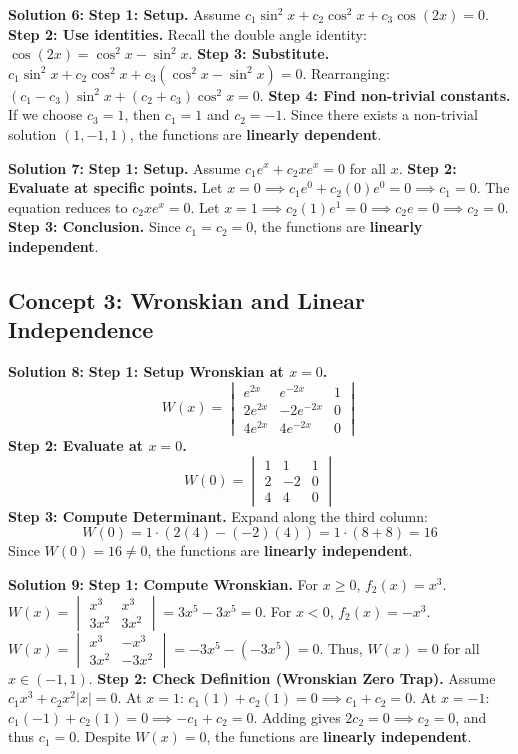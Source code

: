 \documentclass[12pt]{article}
\begin{document}
\textbf{Solution 6:}
\textbf{Step 1: Setup.} Assume $c_1\sin^2 x + c_2\cos^2 x + c_3\cos(2x) = 0$.
\textbf{Step 2: Use identities.} Recall the double angle identity: $\cos(2x) = \cos^2 x - \sin^2 x$.
\textbf{Step 3: Substitute.} $c_1\sin^2 x + c_2\cos^2 x + c_3(\cos^2 x - \sin^2 x) = 0$.
Rearranging: $(c_1 - c_3)\sin^2 x + (c_2 + c_3)\cos^2 x = 0$.
\textbf{Step 4: Find non-trivial constants.} If we choose $c_3 = 1$, then $c_1 = 1$ and $c_2 = -1$. Since there exists a non-trivial solution $(1, -1, 1)$, the functions are \textbf{linearly dependent}.

\textbf{Solution 7:}
\textbf{Step 1: Setup.} Assume $c_1e^x + c_2xe^x = 0$ for all $x$.
\textbf{Step 2: Evaluate at specific points.}
Let $x=0 \implies c_1e^0 + c_2(0)e^0 = 0 \implies c_1 = 0$.
The equation reduces to $c_2xe^x = 0$.
Let $x=1 \implies c_2(1)e^1 = 0 \implies c_2e = 0 \implies c_2 = 0$.
\textbf{Step 3: Conclusion.} Since $c_1=c_2=0$, the functions are \textbf{linearly independent}.

\subsection*{Concept 3: Wronskian and Linear Independence}

\textbf{Solution 8:}
\textbf{Step 1: Setup Wronskian at $x=0$.}
$$W(x) = \begin{vmatrix} e^{2x} & e^{-2x} & 1 \\ 2e^{2x} & -2e^{-2x} & 0 \\ 4e^{2x} & 4e^{-2x} & 0 \end{vmatrix}$$
\textbf{Step 2: Evaluate at $x=0$.}
$$W(0) = \begin{vmatrix} 1 & 1 & 1 \\ 2 & -2 & 0 \\ 4 & 4 & 0 \end{vmatrix}$$
\textbf{Step 3: Compute Determinant.} Expand along the third column:
$$W(0) = 1 \cdot (2(4) - (-2)(4)) = 1 \cdot (8 + 8) = 16$$
Since $W(0) = 16 \neq 0$, the functions are \textbf{linearly independent}.

\textbf{Solution 9:}
\textbf{Step 1: Compute Wronskian.}
For $x \ge 0$, $f_2(x) = x^3$. $W(x) = \begin{vmatrix} x^3 & x^3 \\ 3x^2 & 3x^2 \end{vmatrix} = 3x^5 - 3x^5 = 0$.
For $x < 0$, $f_2(x) = -x^3$. $W(x) = \begin{vmatrix} x^3 & -x^3 \\ 3x^2 & -3x^2 \end{vmatrix} = -3x^5 - (-3x^5) = 0$.
Thus, $W(x) = 0$ for all $x \in (-1, 1)$.
\textbf{Step 2: Check Definition (Wronskian Zero Trap).}
Assume $c_1x^3 + c_2x^2|x| = 0$.
At $x=1$: $c_1(1) + c_2(1) = 0 \implies c_1 + c_2 = 0$.
At $x=-1$: $c_1(-1) + c_2(1) = 0 \implies -c_1 + c_2 = 0$.
Adding gives $2c_2 = 0 \implies c_2 = 0$, and thus $c_1 = 0$.
Despite $W(x)=0$, the functions are \textbf{linearly independent}.
\end{document}
